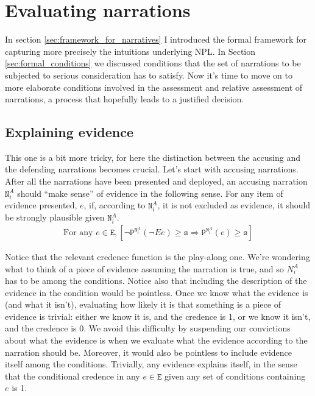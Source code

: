\documentclass[10pt,leqno]{article}
\newcommand{\n}{\neg}
\begin{document}
\section{Evaluating narrations}\label{sec:Evaluating_narrations}

In section \ref{sec:framework_for_narratives} I introduced the formal framework for capturing more precisely the intuitions underlying NPL. In Section \ref{sec:formal_conditions} we discussed conditions that the set of narrations to be subjected to serious consideration has to satisfy. Now it's time to move on  to  more elaborate conditions involved in the assessment and relative assessment of narrations, a process that hopefully leads to a justified decision.


\subsection{Explaining evidence}

This one is a bit more tricky, for here the distinction between the accusing and the defending narrations becomes crucial. Let's start with accusing narrations. After all the narrations have been presented and deployed, an accusing narration $\mathtt{N}^A_i$ should ``make sense'' of evidence in the following sense. For any item of evidence presented, $e$, if,  according to
 $\mathtt{N}^A_i$,  it is not excluded  as evidence,   it  should be strongly plausible given $\mathtt{N}^A_i$.
\begin{align}
\tag{Explaining evidence A}
\label{Explaining evidence A}
 \mbox{For any } e\in \mathtt{E}, [  \n  \mathtt{P}^{\mathtt{N}^A_i}(\n E e) \geq \mathtt{s} \Rightarrow \mathtt{P}^{\mathtt{N}^A_i}(e) \geq \mathtt{s}  ] 
\end{align}

Notice that the relevant credence function is the play-along one. We're wondering what to think of a piece of evidence assuming the narration is true, and so $N^A_i$ has to be among the conditions. Notice also that including the  description of the evidence in the condition would be pointless. Once we know what the evidence is (and what it isn't), evaluating how likely it is that something is a piece of evidence is trivial: either we know it is, and the credence is 1, or we know it isn't, and the credence is 0. We avoid this difficulty by   suspending our convictions about what the evidence is when we evaluate what the evidence according to the narration should be. Moreover, it  would also be pointless to include evidence itself among the conditions. Trivially, any evidence explains itself, in the sense that the conditional credence in any $e\in \mathtt{E}$ given any set of conditions containing $e$  is 1.
\end{document}
